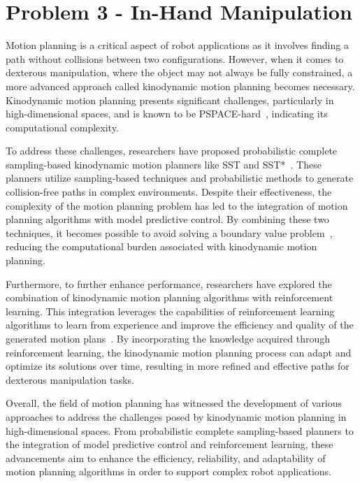\section{Problem 3 - In-Hand Manipulation}\label{sec:lit-rev-problem-3}

Motion planning is a critical aspect of robot applications as it involves finding a path without collisions between two configurations. However, when it comes to dexterous manipulation, where the object may not always be fully constrained, a more advanced approach called kinodynamic motion planning becomes necessary. Kinodynamic motion planning presents significant challenges, particularly in high-dimensional spaces, and is known to be PSPACE-hard~\cite*{planning-algorithms}, indicating its computational complexity.

To address these challenges, researchers have proposed probabilistic complete sampling-based kinodynamic motion planners like SST and SST*~\cite{asymptotically-optimal-sampling-based-kinodynamic-planning}. These planners utilize sampling-based techniques and probabilistic methods to generate collision-free paths in complex environments. Despite their effectiveness, the complexity of the motion planning problem has led to the integration of motion planning algorithms with model predictive control. By combining these two techniques, it becomes possible to avoid solving a boundary value problem~\cite{mpc-mpnet-model-predictive-motion-planning-networks-for-fast-near-optimal-planning-under-kinodynamic-constraints}, reducing the computational burden associated with kinodynamic motion planning.

Furthermore, to further enhance performance, researchers have explored the combination of kinodynamic motion planning algorithms with reinforcement learning. This integration leverages the capabilities of reinforcement learning algorithms to learn from experience and improve the efficiency and quality of the generated motion plans~\cite{sampling-based-exploration-for-reinforcement-learning-of-dexterous-manipulation}. By incorporating the knowledge acquired through reinforcement learning, the kinodynamic motion planning process can adapt and optimize its solutions over time, resulting in more refined and effective paths for dexterous manipulation tasks.

Overall, the field of motion planning has witnessed the development of various approaches to address the challenges posed by kinodynamic motion planning in high-dimensional spaces. From probabilistic complete sampling-based planners to the integration of model predictive control and reinforcement learning, these advancements aim to enhance the efficiency, reliability, and adaptability of motion planning algorithms in order to support complex robot applications.


